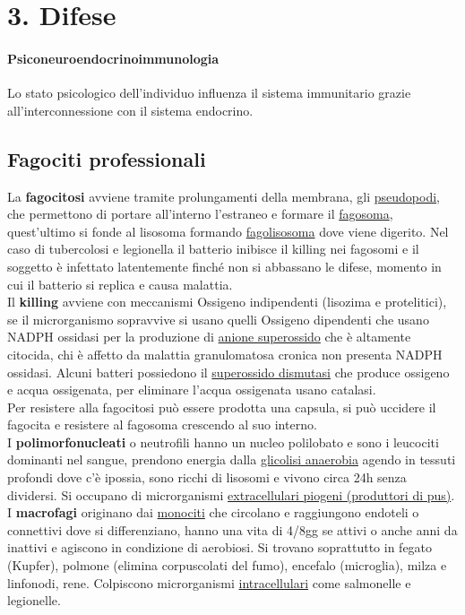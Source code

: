 \documentclass[10pt]{article}
\begin{document}
\section*{3. Difese}
\paragraph*{Psiconeuroendocrinoimmunologia} Lo stato psicologico dell'individuo influenza il sistema immunitario grazie all'interconnessione con il sistema endocrino.
\subsection*{Fagociti professionali}
La \textbf{fagocitosi} avviene tramite prolungamenti della membrana, gli \underline{pseudopodi}, che permettono di portare all'interno l'estraneo e formare il \underline{fagosoma}, quest'ultimo si fonde al lisosoma formando \underline{fagolisosoma} dove viene digerito. Nel caso di tubercolosi e legionella il batterio inibisce il killing nei fagosomi e il soggetto è infettato latentemente finché non si abbassano le difese, momento in cui il batterio si replica e causa malattia.\\
Il \textbf{killing} avviene con meccanismi Ossigeno indipendenti (lisozima e protelitici), se il microrganismo sopravvive si usano quelli Ossigeno dipendenti che usano NADPH ossidasi per la produzione di \underline{anione superossido} che è altamente citocida, chi è affetto da malattia granulomatosa cronica non presenta NADPH ossidasi. Alcuni batteri possiedono il \underline{superossido dismutasi} che produce ossigeno e acqua ossigenata, per eliminare l'acqua ossigenata usano catalasi. \\
Per resistere alla fagocitosi può essere prodotta una capsula, si può uccidere il fagocita e resistere al fagosoma crescendo al suo interno.\\ 
I \textbf{polimorfonucleati} o neutrofili hanno un nucleo polilobato e sono i leucociti dominanti nel sangue, prendono energia dalla \underline{glicolisi anaerobia} agendo in tessuti profondi dove c'è ipossia, sono ricchi di lisosomi e vivono circa 24h senza dividersi. Si occupano di microrganismi \underline{extracellulari piogeni (produttori di pus)}.\\
I \textbf{macrofagi} originano dai \underline{monociti} che circolano e raggiungono endoteli o connettivi dove si differenziano, hanno una vita di 4/8gg se attivi o anche anni da inattivi e agiscono in condizione di aerobiosi. Si trovano soprattutto in fegato (Kupfer), polmone (elimina corpuscolati del fumo), encefalo (microglia), milza e linfonodi, rene. Colpiscono microrganismi \underline{intracellulari} come salmonelle e legionelle.\\\\
\end{document}
